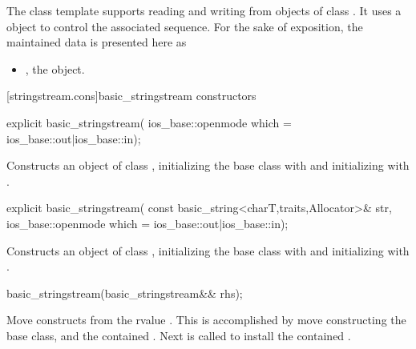 \pnum
The
class template
supports reading and writing from objects of class
.
It uses a
object to control the associated sequence.
For the sake of exposition, the maintained data is presented here as
\begin{itemize}
\item
{}, the  object.
\end{itemize}

[stringstream.cons]{basic_stringstream constructors}

%
\begin{itemdecl}
explicit basic_stringstream(
    ios_base::openmode which = ios_base::out|ios_base::in);
\end{itemdecl}

\begin{itemdescr}
\pnum
\effects
Constructs an object of class
,
initializing the base class with
and initializing
with
.
\end{itemdescr}

%
\begin{itemdecl}
explicit basic_stringstream(
    const basic_string<charT,traits,Allocator>& str,
    ios_base::openmode which = ios_base::out|ios_base::in);
\end{itemdecl}

\begin{itemdescr}
\pnum
\effects
Constructs an object of class
,
initializing the base class with
and initializing
with
.
\end{itemdescr}

%
\begin{itemdecl}
basic_stringstream(basic_stringstream&& rhs);
\end{itemdecl}

\begin{itemdescr}
\pnum
\effects Move constructs from the rvalue . This
is accomplished by move constructing the base class, and the contained
.
Next  is called to
install the contained .
\end{itemdescr}

